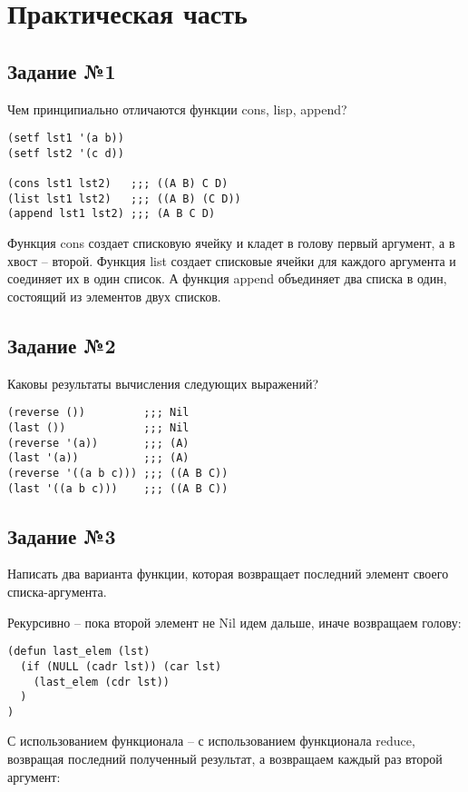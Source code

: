 \chapter{Практическая часть}

\section{Задание №1}

Чем принципиально отличаются функции cons, lisp, append?

\begin{lstlisting}
(setf lst1 '(a b))
(setf lst2 '(c d))

(cons lst1 lst2)   ;;; ((A B) C D)
(list lst1 lst2)   ;;; ((A B) (C D))
(append lst1 lst2) ;;; (A B C D)
\end{lstlisting}

Функция cons создает списковую ячейку и кладет в голову первый аргумент, а в хвост --
второй. Функция list создает списковые ячейки для каждого аргумента и соединяет
их в один список. А функция append объединяет два списка в один, состоящий из
элементов двух списков.

\section{Задание №2}

Каковы результаты вычисления следующих выражений?

\begin{lstlisting}
(reverse ())         ;;; Nil
(last ())            ;;; Nil
(reverse '(a))       ;;; (A)
(last '(a))          ;;; (A)
(reverse '((a b c))) ;;; ((A B C))
(last '((a b c)))    ;;; ((A B C))
\end{lstlisting}

\section{Задание №3}

Написать два варианта функции, которая возвращает последний элемент своего
списка-аргумента.

Рекурсивно -- пока второй элемент не Nil идем дальше, иначе возвращаем голову:

\begin{lstlisting}
(defun last_elem (lst)
  (if (NULL (cadr lst)) (car lst)
    (last_elem (cdr lst))
  )
)
\end{lstlisting}

С использованием функционала -- с использованием функционала reduce, возвращая последний полученный результат, а возвращаем каждый раз второй аргумент:

